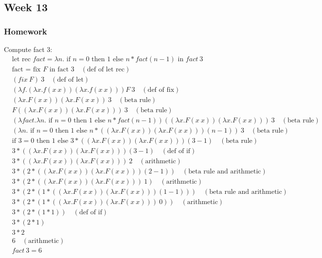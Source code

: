 \documentclass{article}
\theoremstyle{theorem}
\theoremstyle{definition}
\theoremstyle{remark}
\begin{document}
\subsection{Week 13}
\subsubsection*{Homework}
Compute fact 3: \\

\begin{align*}
& \text{let rec } fact = \lambda n. \text{ if } n=0 \text{ then } 1 \text{ else } n * fact (n-1) \text{ in } fact \ 3 \\
& \text{fact = fix } F \text{ in fact } 3 \quad (\text{def of let rec}) \\
& (fix \ F) \ 3 \quad (\text{def of let}) \\
& (\lambda f. (\lambda x. f (x \ x)) (\lambda x. f (x \ x))) F \ 3 \quad (\text{def of fix}) \\
& (\lambda x. F (x \ x)) (\lambda x. F (x \ x)) \ 3 \quad (\text{beta rule}) \\
& F ((\lambda x. F (x \ x)) (\lambda x. F (x \ x))) \ 3 \quad (\text{beta rule}) \\
& (\lambda fact. \lambda n. \text{ if } n=0 \text{ then } 1 \text{ else } n * fact (n-1)) ((\lambda x. F (x \ x)) (\lambda x. F (x \ x))) \ 3 \quad (\text{beta rule}) \\
& (\lambda n. \text{ if } n=0 \text{ then } 1 \text{ else } n * ((\lambda x. F (x \ x)) (\lambda x. F (x \ x))) (n-1)) \ 3 \quad (\text{beta rule}) \\
& \text{if } 3=0 \text{ then } 1 \text{ else } 3 * ((\lambda x. F (x \ x)) (\lambda x. F (x \ x))) (3-1) \quad (\text{beta rule}) \\
& 3 * ((\lambda x. F (x \ x)) (\lambda x. F (x \ x))) (3-1) \quad (\text{def of if}) \\
& 3 * ((\lambda x. F (x \ x)) (\lambda x. F (x \ x))) \ 2 \quad (\text{arithmetic}) \\
& 3 * (2 * ((\lambda x. F (x \ x)) (\lambda x. F (x \ x))) (2-1)) \quad (\text{beta rule and arithmetic}) \\
& 3 * (2 * ((\lambda x. F (x \ x)) (\lambda x. F (x \ x))) \ 1) \quad (\text{arithmetic}) \\
& 3 * (2 * (1 * ((\lambda x. F (x \ x)) (\lambda x. F (x \ x))) (1-1))) \quad (\text{beta rule and arithmetic}) \\
& 3 * (2 * (1 * ((\lambda x. F (x \ x)) (\lambda x. F (x \ x))) \ 0)) \quad (\text{arithmetic}) \\
& 3 * (2 * (1 * 1)) \quad (\text{def of if}) \\
& 3 * (2 * 1) \\
& 3 * 2 \\
& 6 \quad (\text{arithmetic}) \\
& fact \ 3 = 6
\end{align*}
\end{document}
